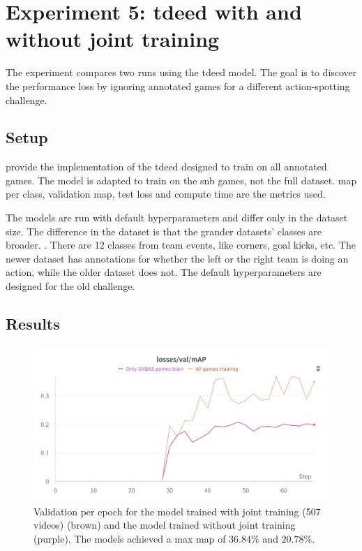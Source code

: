 \section{Experiment 5: \acrshort{tdeed} with and without joint training}
\label{sec:experiment_5}

The experiment compares two runs using the \acrfull{tdeed} model. The goal is to discover the performance loss by ignoring annotated games for a different action-spotting challenge. 

\subsection{Setup}
\label{ssec:ex5_setup}

\textcite{cioppa_soccernet_2024} provide the implementation of the \acrshort{tdeed} designed to train on all annotated games. The model is adapted to train on the \acrshort{snb} games, not the full dataset. \acrshort{map} per class, validation \acrshort{map}, test loss and compute time are the metrics used. 

The models are run with default hyperparameters and differ only in the dataset size. The difference in the dataset is that the grander datasets' classes are broader. . There are 12 classes from team events, like corners, goal kicks, etc. The newer dataset has annotations for whether the left or the right team is doing an action, while the older dataset does not. The default hyperparameters are designed for the old challenge. 


\subsection{Results}
\label{ssec:ex5_results}

\begin{figure}
    \centering
    \includegraphics[width=0.75\linewidth]{figures/500_7_val_compare.png}
    \caption{Validation per epoch for the model trained with joint training (507 videos) (brown) and the model trained without joint training (purple). The models achieved a max \acrshort{map} of $36.84\%$ and $20.78\%$. }
    \label{fig:500_7_val_compare}
\end{figure}


